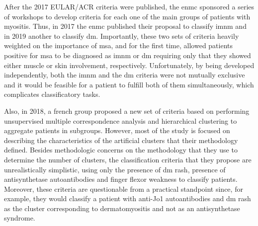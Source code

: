 After the 2017 EULAR/ACR criteria were published, the \gls{enmc} sponsored a series of workshops to develop criteria for each one of the main groups of patients with myositis. Thus, in 2017 the \gls{enmc} published their proposal to classify \gls{imnm}\cite{Allenbach2017} and in 2019 another to classify \gls{dm}.\cite{Mammen2020} Importantly, these two sets of criteria heavily weighted on the importance of \gls{msa}, and for the first time, allowed patients positive for \gls{msa} to be diagnosed as \gls{imnm} or \gls{dm} requiring only that they showed either muscle or skin involvement, respectively. Unfortunately, by being developed independently, both the \gls{imnm} and the \gls{dm} criteria were not mutually exclusive and it would be feasible for a patient to fulfill both of them simultaneously, which complicates classificatory tasks.

Also, in 2018, a french group proposed a new set of criteria based on performing unsupervised multiple correspondence analysis and hierarchical clustering to aggregate patients in subgroups.\cite{Mariampillai2018} However, most of the study is focused on describing the characteristics of the artificial clusters that their methodology defined. Besides methodologic concerns on the methodology that they use to determine the number of clusters,\cite{PinalFernandez2019} the classification criteria that they propose are unrealistically simplistic, using only the presence of \gls{dm} rash, presence of antisynthetase autoantibodies and finger flexor weakness to classify patients. Moreover, these criteria are questionable from a practical standpoint since, for example, they would classify a patient with anti-Jo1 autoantibodies and \gls{dm} rash as the cluster corresponding to dermatomyositis and not as an antisynthetase syndrome.

